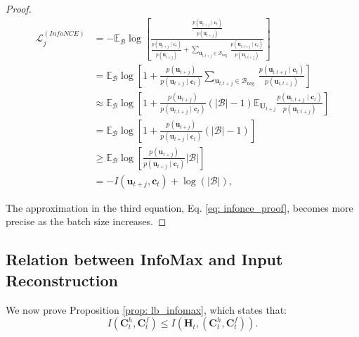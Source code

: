 \documentclass{article}
\theoremstyle{plain}
\theoremstyle{definition}
\theoremstyle{remark}
\begin{document}
\begin{proof}
\begin{equation}
\begin{aligned}
\mathcal{L}^{(InfoNCE)}_j & =-\mathbb{E}_{\mathcal{B}} \log \left[\frac{\frac{p\left(\mathbf{u}_{t+j} \mid \mathbf{c}_t\right)}{p\left(\mathbf{u}_{t+j}\right)}}{\frac{p\left(\mathbf{u}_{t+j} \mid \mathbf{c}_t\right)}{p\left(\mathbf{u}_{t+j}\right)}+\sum_{\mathbf{u}_{l, t+j} \in \mathcal{B}_{\text {neg }}} \frac{p\left(\mathbf{u}_{l, t+j} \mid \mathbf{c}_t\right)}{p\left(\mathbf{u}_{l, t+j}\right)}}\right] \\
& =\mathbb{E}_{\mathcal{B}} \log \left[1+\frac{p\left(\mathbf{u}_{t+j}\right)}{p\left(\mathbf{u}_{t+j} \mid \mathbf{c}_t\right)} \sum_{\mathbf{u}_{l, t+j} \in \mathcal{B}_{\text {neg }}} \frac{p\left(\mathbf{u}_{l, t+j} \mid \mathbf{c}_t\right)}{p\left(\mathbf{u}_{l, t+j}\right)}\right] \\
& \approx \mathbb{E}_{\mathcal{B} }\log \left[1+\frac{p\left(\mathbf{u}_{t+j}\right)}{p\left(\mathbf{u}_{l, t+j} \mid \mathbf{c}_t\right)}(|\mathcal{B}|-1) \mathbb{E}_{\mathbf{U}_{t+j}} \frac{p\left(\mathbf{u}_{l, t+j}\mid \mathbf{c}_t\right)}{p\left(\mathbf{u}_{l, t+j}\right)}\right] \\
& =\mathbb{E}_{\mathcal{B}} \log \left[1+\frac{p\left(\mathbf{u}_{t+j}\right)}{p\left(\mathbf{u}_{t+j} \mid \mathbf{c}_t\right)}(|\mathcal{B}|-1)\right] \\
& \geq \mathbb{E}_{\mathcal{B}} \log \left[\frac{p\left(\mathbf{u}_{t+j}\right)}{p\left(\mathbf{u}_{t+j}\mid \mathbf{c}_t\right)} |\mathcal{B}|\right] \\
& =-I\left(\mathbf{u}_{t+j}, \mathbf{c}_t\right)+\log (|\mathcal{B}|),
\end{aligned}
\label{eq: infonce_proof}
\end{equation}

The approximation in the third equation, Eq. \eqref{eq: infonce_proof}, becomes more precise as the batch size increases.
\end{proof}

\subsection{Relation between InfoMax and Input Reconstruction}

We now prove Proposition \ref{prop: lb_infomax}, which states that:
\[
I(\mathbf{C}_t^h,\mathbf{C}_t^f) \leq I(\mathbf{H}_{t}, (\mathbf{C}_t^h, \mathbf{C}_t^f)).
\]
\end{document}
